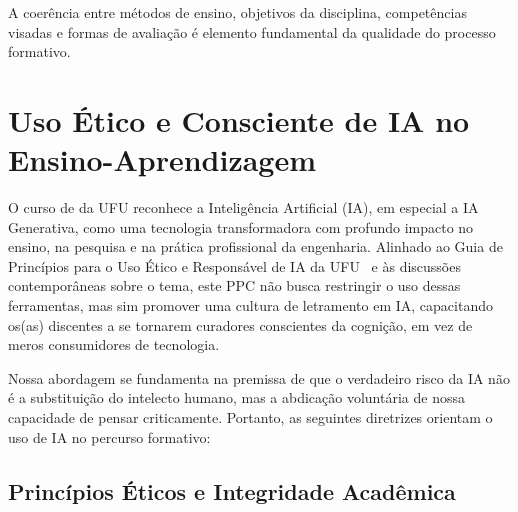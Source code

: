 A coerência entre métodos de ensino, objetivos da disciplina, competências visadas e formas de avaliação é elemento fundamental da qualidade do processo formativo.

\section{Uso Ético e Consciente de IA no Ensino-Aprendizagem}
\label{sec:IA-UFU}

O curso de \nomecursonovo da UFU reconhece a Inteligência Artificial (IA), em especial a IA Generativa, como uma tecnologia transformadora com profundo impacto no ensino, na pesquisa e na prática profissional da engenharia. Alinhado ao Guia de Princípios para o Uso Ético e Responsável de IA da UFU~\cite{UFU2025GuiaIA} e às discussões contemporâneas sobre o tema, este PPC não busca restringir o uso dessas ferramentas, mas sim promover uma cultura de letramento em IA, capacitando os(as) discentes a se tornarem curadores conscientes da cognição, em vez de meros consumidores de tecnologia.

Nossa abordagem se fundamenta na premissa de que o verdadeiro risco da IA não é a substituição do intelecto humano, mas a abdicação voluntária de nossa capacidade de pensar criticamente. Portanto, as seguintes diretrizes orientam o uso de IA no percurso formativo:

\subsection{Princípios Éticos e Integridade Acadêmica}

